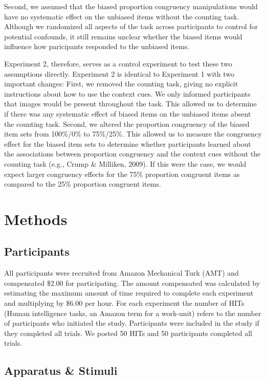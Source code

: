 \documentclass[english,,man,floatsintext]{apa6}
\begin{document}
Second, we assumed that the biased proportion congruency manipulations would have no systematic effect on the unbiased items without the counting task. Although we randomized all aspects of the task across participants to control for potential confounds, it still remains unclear whether the biased items would influence how paricipants responded to the unbiased items.

Experiment 2, therefore, serves as a control experiment to test these two assumptions directly. Experiment 2 is identical to Experiment 1 with two important changes: First, we removed the counting task, giving no explicit instructions about how to use the context cues. We only informed participants that images would be present throughout the task. This allowed us to determine if there was any systematic effect of biased items on the unbiased items absent the counting task. Second, we altered the proportion congruency of the biased item sets from 100\%/0\% to 75\%/25\%. This allowed us to measure the congruency effect for the biased item sets to determine whether participants learned about the associations between proportion congruency and the context cues without the counting task (e.g., Crump \& Milliken, 2009). If this were the case, we would expect larger congruency effects for the 75\% proportion congruent items as compared to the 25\% proportion congruent items.

\hypertarget{methods-1}{%
\section{Methods}\label{methods-1}}

\hypertarget{participants-1}{%
\subsection{Participants}\label{participants-1}}

All participants were recruited from Amazon Mechanical Turk (AMT) and compensated \$2.00 for participating. The amount compensated was calculated by estimating the maximum amount of time required to complete each experiment and multiplying by \$6.00 per hour. For each experiment the number of HITs (Human intelligence tasks, an Amazon term for a work-unit) refers to the number of participants who initiated the study. Participants were included in the study if they completed all trials. We posted 50 HITs and 50 participants completed all trials.

\hypertarget{apparatus-stimuli-1}{%
\subsection{Apparatus \& Stimuli}\label{apparatus-stimuli-1}}
\end{document}
